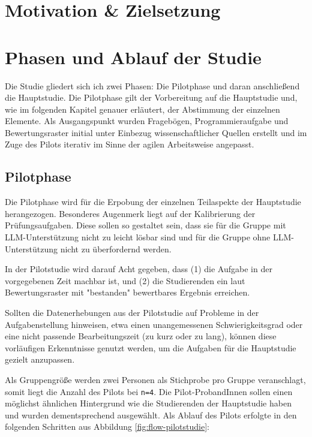\section{Motivation \& Zielsetzung}

\section{Phasen und Ablauf der Studie}

Die Studie gliedert sich ich zwei Phasen: Die Pilotphase und daran anschließend die Hauptstudie. Die Pilotphase gilt der Vorbereitung auf die Hauptstudie und, wie im folgenden Kapitel genauer erläutert, der Abstimmung der einzelnen Elemente. Als Ausgangspunkt wurden Fragebögen, Programmieraufgabe und Bewertungsraster initial unter Einbezug wissenschaftlicher Quellen erstellt und im Zuge des Pilots iterativ im Sinne der agilen Arbeitsweise angepasst.

\subsection{Pilotphase}
Die Pilotphase wird für die Erpobung der einzelnen Teilaspekte der Hauptstudie herangezogen. Besonderes Augenmerk liegt auf der Kalibrierung der Prüfungsaufgaben. Diese sollen so gestaltet sein, dass sie für die Gruppe mit LLM-Unterstützung nicht zu leicht lösbar sind und für die Gruppe ohne LLM-Unterstützung nicht zu überfordernd werden.

In der Pilotstudie wird darauf Acht gegeben, dass (1) die Aufgabe in der vorgegebenen Zeit machbar ist, und (2) die Studierenden ein laut Bewertungsraster mit "bestanden" bewertbares Ergebnis erreichen.

Sollten die Datenerhebungen aus der Pilotstudie auf Probleme in der Aufgabenstellung hinweisen, etwa einen unangemessenen Schwierigkeitsgrad oder eine nicht passende Bearbeitungszeit (zu kurz oder zu lang), können diese vorläufigen Erkenntnisse genutzt werden, um die Aufgaben für die Hauptstudie gezielt anzupassen.

Als Gruppengröße werden zwei Personen als Stichprobe pro Gruppe veranschlagt, somit liegt die Anzahl des Pilots bei \texttt{n=4}. Die Pilot-ProbandInnen sollen einen möglichst ähnlichen Hintergrund wie die Studierenden der Hauptstudie haben und wurden dementsprechend ausgewählt. Als Ablauf des Pilots erfolgte in den folgenden Schritten aus Abbildung \ref{fig:flow-pilotstudie}:

